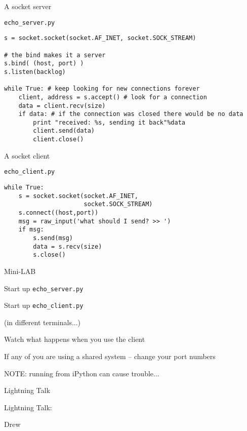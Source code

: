 \documentclass{beamer}
\begin{document}
\begin{frame}[fragile]{A socket server}

{\Large \verb|echo_server.py|}
\begin{verbatim}
s = socket.socket(socket.AF_INET, socket.SOCK_STREAM) 

# the bind makes it a server
s.bind( (host, port) ) 
s.listen(backlog) 

while True: # keep looking for new connections forever
    client, address = s.accept() # look for a connection
    data = client.recv(size)
    if data: # if the connection was closed there would be no data
        print "received: %s, sending it back"%data
        client.send(data) 
        client.close()
\end{verbatim}
\end{frame}

\begin{frame}[fragile]{A socket client}

{\Large \verb|echo_client.py|}
\begin{verbatim}
while True:
    s = socket.socket(socket.AF_INET, 
                      socket.SOCK_STREAM) 
    s.connect((host,port)) 
    msg = raw_input('what should I send? >> ')
    if msg:
        s.send(msg) 
        data = s.recv(size) 
        s.close() 
\end{verbatim}
\end{frame}

\begin{frame}[fragile]{Mini-LAB}

{\Large Start up \verb|echo_server.py|}

\vfill
{\Large Start up \verb|echo_client.py|}

\vfill
(in different terminals...)

\vfill
{\Large Watch what happens when you use the client}

\vfill
If any of you are using a shared system -- change your port numbers

NOTE: running from iPython can cause trouble...
\end{frame}


\begin{frame}{Lightning Talk}

{\centering

\vfill
{\LARGE Lightning Talk:  }

\vfill
{\Huge Drew}

\vfill
}
\end{frame}
\end{document}
